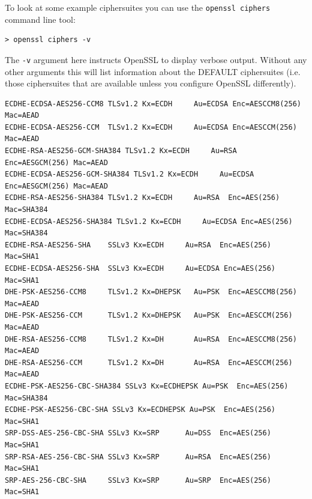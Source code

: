 To look at some example ciphersuites you can use the \lstinline!openssl ciphers!
command line tool:
\begin{lstlisting}[caption=Showing the openssl DEFAULT ciphersuites]
> openssl ciphers -v
\end{lstlisting}

The \lstinline!-v! argument here instructs OpenSSL to display verbose output.
Without any other arguments this will list information about the DEFAULT
ciphersuites (i.e. those ciphersuites that are available unless you configure
OpenSSL differently).

\begin{lstlisting}[float=tb,label=lst:ciphers-extract,caption=An
extract from \lstinline!openssl ciphers -v! output]
ECDHE-ECDSA-AES256-CCM8 TLSv1.2 Kx=ECDH     Au=ECDSA Enc=AESCCM8(256) Mac=AEAD
ECDHE-ECDSA-AES256-CCM  TLSv1.2 Kx=ECDH     Au=ECDSA Enc=AESCCM(256) Mac=AEAD
ECDHE-RSA-AES256-GCM-SHA384 TLSv1.2 Kx=ECDH     Au=RSA  Enc=AESGCM(256) Mac=AEAD
ECDHE-ECDSA-AES256-GCM-SHA384 TLSv1.2 Kx=ECDH     Au=ECDSA Enc=AESGCM(256) Mac=AEAD
ECDHE-RSA-AES256-SHA384 TLSv1.2 Kx=ECDH     Au=RSA  Enc=AES(256)  Mac=SHA384
ECDHE-ECDSA-AES256-SHA384 TLSv1.2 Kx=ECDH     Au=ECDSA Enc=AES(256)  Mac=SHA384
ECDHE-RSA-AES256-SHA    SSLv3 Kx=ECDH     Au=RSA  Enc=AES(256)  Mac=SHA1
ECDHE-ECDSA-AES256-SHA  SSLv3 Kx=ECDH     Au=ECDSA Enc=AES(256)  Mac=SHA1
DHE-PSK-AES256-CCM8     TLSv1.2 Kx=DHEPSK   Au=PSK  Enc=AESCCM8(256) Mac=AEAD
DHE-PSK-AES256-CCM      TLSv1.2 Kx=DHEPSK   Au=PSK  Enc=AESCCM(256) Mac=AEAD
DHE-RSA-AES256-CCM8     TLSv1.2 Kx=DH       Au=RSA  Enc=AESCCM8(256) Mac=AEAD
DHE-RSA-AES256-CCM      TLSv1.2 Kx=DH       Au=RSA  Enc=AESCCM(256) Mac=AEAD
ECDHE-PSK-AES256-CBC-SHA384 SSLv3 Kx=ECDHEPSK Au=PSK  Enc=AES(256)  Mac=SHA384
ECDHE-PSK-AES256-CBC-SHA SSLv3 Kx=ECDHEPSK Au=PSK  Enc=AES(256)  Mac=SHA1
SRP-DSS-AES-256-CBC-SHA SSLv3 Kx=SRP      Au=DSS  Enc=AES(256)  Mac=SHA1
SRP-RSA-AES-256-CBC-SHA SSLv3 Kx=SRP      Au=RSA  Enc=AES(256)  Mac=SHA1
SRP-AES-256-CBC-SHA     SSLv3 Kx=SRP      Au=SRP  Enc=AES(256)  Mac=SHA1
\end{lstlisting}

